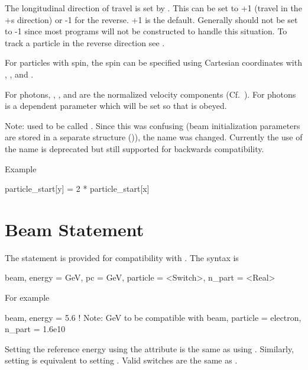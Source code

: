 The longitudinal direction of travel is set by .  This can be set
to +1 (travel in the +s direction) or -1 for the reverse.  +1 is the default. Generally
 should not be set to -1 since most programs will not be
constructed to handle this situation. To track a particle in the reverse direction see
. 

For particles with spin, the spin can be specified using Cartesian coordinates with ,
, and .

For photons, , , and  are the normalized velocity components
(Cf.~). For photons  is a dependent parameter which will be set so that 
is obeyed.

Note:  used to be called . Since this was confusing (beam
initialization parameters are stored in a separate  structure
()), the name was changed. Currently the use of the  name
is deprecated but still supported for backwards compatibility.

Example
\begin{example}
  particle_start[y] = 2 * particle_start[x]
\end{example}

\section{Beam Statement}
\label{s:beam.mad}

The  statement is provided for compatibility with \mad. The syntax is
\begin{example}
  beam, energy = GeV, pc = GeV, particle = <Switch>, n_part = <Real>
\end{example}
For example
\begin{example}
  beam, energy = 5.6  ! Note: GeV to be compatible with \mad
  beam, particle = electron, n_part = 1.6e10
\end{example}
Setting the reference energy using the  attribute is the
same as using . Similarly, setting  is
equivalent to setting . Valid  switches
are the same as .

